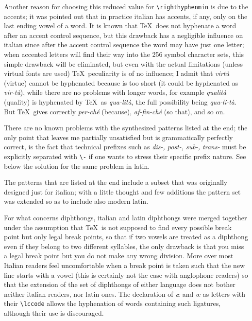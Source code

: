 Another reason for choosing this reduced value for \verb"\righthyphenmin" is
due to the accents; it was pointed out that in practice italian has accents,
if any, only on the last ending vowel of a word. It is known that \TeX\ does
not hyphenate a word after an accent control sequence, but this drawback has
a  negligible  influence  on italian since after the accent control sequence
the word may have just one letter; when accented letters will find their way
into the 256 symbol character sets, this simple drawback will be eliminated,
but even with the actual limitations (unless virtual fonts are  used)  \TeX\
peculiarity  is  of no influence; I admit that {\it virt\`u} (virtue) cannot
be hyphenated  because  is  too  short  (it  could  be  hyphenated  as  {\it
vir-t\`u\/}),  while  there  are  no problems with longer words, for example
{\it qualit\`a} (quality) is hyphenated by \TeX\ as  {\it  qua-lit\`a},  the
full  possibility  being  {\it  qua-li-t\`a}. But \TeX\ gives correctly {\it
per-ch\'e} (because), {\it af-fin-ch\'e} (so that), and so on.

There are no known problems with the synthesized patterns listed at the end;
the only point that leaves me partially  unsatisfied  but  is  grammatically
perfectly  correct,  is  the fact that technical prefixes such as {\it dis-,
post-, sub-, trans-} must be explicitly  separated  with  \verb"\-"  if  one
wants to stress their specific prefix nature. See below the solution for the
same problem in latin.



  The  patterns  that  are listed at the end include a
subset that was originally designed just for italian; with a little  thought
and  few additions the pattern set was extended so as to include also modern
latin.

For  what  concerns  diphthongs,  italian  and  latin diphthongs were merged
together under the assumption that \TeX\  is  not  supposed  to  find  every
possible  break point but only legal break points, so that if two vowels are
treated as a diphthong even if they belong to two different  syllables,  the
only  drawback  is that you miss a legal break point but you do not make any
wrong division. More over most Italian readers  feel  uncomfortable  when  a
break  point  is  taken  such that the new line starts with a vowel (this is
certainly not the case with anglophone readers) so that the extension of the
set  of  diphthongs  of    either  language  does not bother neither italian
readers, nor latin ones. The declaration of  {\it  \ae}  and  {\it  \oe}  as
letters with their \verb"\lccode" allows the hyphenation of words containing
such ligatures, although their use is discouraged.

